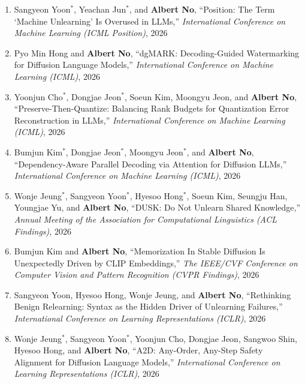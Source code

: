 \documentclass[10pt]{article}
\begin{document}
\begin{enumerate}[(C1)]
\item Sangyeon Yoon$^*$, Yeachan Jun$^*$, and {{\bf Albert No}},
``Position: The Term `Machine Unlearning' Is Overused in LLMs,''
{\it International Conference on Machine Learning (ICML Position)}, 2026\\

\item Pyo Min Hong and {{\bf Albert No}},
``dgMARK: Decoding-Guided Watermarking for Diffusion Language Models,''
{\it International Conference on Machine Learning (ICML)}, 2026\\

\item Yoonjun Cho$^*$, Dongjae Jeon$^*$, Soeun Kim, Moongyu Jeon, and {{\bf Albert No}},
``Preserve-Then-Quantize: Balancing Rank Budgets for Quantization Error Reconstruction in LLMs,''
{\it International Conference on Machine Learning (ICML)}, 2026\\

\item Bumjun Kim$^*$, Dongjae Jeon$^*$, Moongyu Jeon$^*$, and {{\bf Albert No}},
``Dependency-Aware Parallel Decoding via Attention for Diffusion LLMs,''
{\it International Conference on Machine Learning (ICML)}, 2026\\

\item Wonje Jeung$^*$, Sangyeon Yoon$^*$, Hyesoo Hong$^*$, Soeun Kim, Seungju Han, Youngjae Yu, and {{\bf Albert No}},
``DUSK: Do Not Unlearn Shared Knowledge,''
{\it Annual Meeting of the Association for Computational Linguistics (ACL Findings)}, 2026\\

\item Bumjun Kim and {{\bf Albert No}},
``Memorization In Stable Diffusion Is Unexpectedly Driven by CLIP Embeddings,''
{\it The IEEE/CVF Conference on Computer Vision and Pattern Recognition (CVPR Findings)}, 2026\\

\item Sangyeon Yoon, Hyesoo Hong, Wonje Jeung, and {{\bf Albert No}},
``Rethinking Benign Relearning: Syntax as the Hidden Driver of Unlearning Failures,''
{\it International Conference on Learning Representations (ICLR)}, 2026\\

\item Wonje Jeung$^*$, Sangyeon Yoon$^*$, Yoonjun Cho, Dongjae Jeon, Sangwoo Shin, Hyesoo Hong, and {{\bf Albert No}},
``A2D: Any-Order, Any-Step Safety Alignment for Diffusion Language Models,''
{\it International Conference on Learning Representations (ICLR)}, 2026\\


\end{enumerate}
\end{document}
